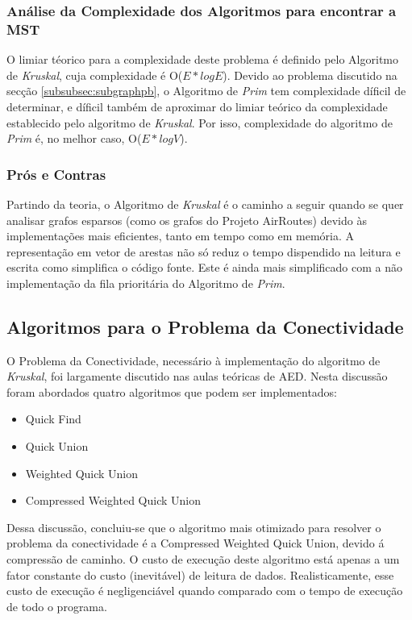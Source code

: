 \documentclass[14pt]{article}
\begin{document}
    \subsubsection[complexity]{Análise da Complexidade dos Algoritmos para encontrar a MST}\label{subsubsec:complexity}
    O limiar téorico para a complexidade deste problema é definido pelo Algoritmo de \emph{Kruskal}, cuja complexidade é O(\(E*log E\)).
    Devido ao problema discutido na secção \ref{subsubsec:subgraphpb}, o Algoritmo de \emph{Prim} tem complexidade díficil de determinar, e díficil
    também de aproximar do limiar teórico da complexidade establecido pelo algoritmo de \emph{Kruskal}.
    Por isso, complexidade do algoritmo de \emph{Prim} é, no melhor caso, O(\(E*log V\)).

    \subsubsection[proscons]{Prós e Contras}
    Partindo da teoria, o Algoritmo de \emph{Kruskal} é o caminho a seguir quando se quer analisar grafos esparsos (como os grafos do Projeto AirRoutes) devido
    às implementações mais eficientes, tanto em tempo como em memória. A representação em vetor de arestas não só reduz o tempo dispendido na leitura
    e escrita como simplifica o código fonte. Este é ainda mais simplificado com a não implementação da fila prioritária do Algoritmo de \emph{Prim}.

    \subsection[Connectivity]{Algoritmos para o Problema da Conectividade}
    O Problema da Conectividade, necessário à implementação do algoritmo de \emph{Kruskal}, foi largamente discutido nas aulas teóricas de AED\@. Nesta discussão
    foram abordados quatro algoritmos que podem ser implementados:
    \begin{itemize}
        \item Quick Find
        \item Quick Union
        \item Weighted Quick Union
        \item Compressed Weighted Quick Union
    \end{itemize}
    Dessa discussão, concluiu-se que o algoritmo mais otimizado para resolver o problema da conectividade é a Compressed Weighted Quick Union, devido á compressão de caminho.
    O custo de execução deste algoritmo está apenas a um fator constante do custo (inevitável) de leitura de dados.
    Realisticamente, esse custo de execução é negligenciável quando comparado com o tempo de execução de todo o programa.
\end{document}
